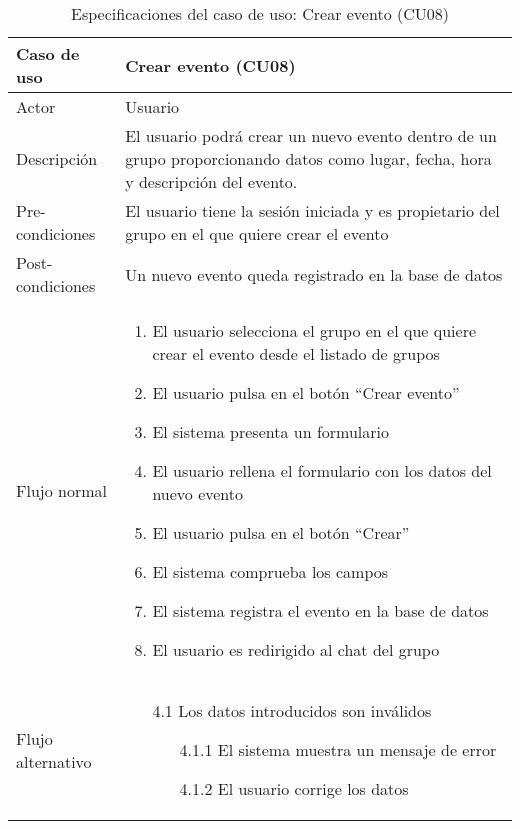 \begin{table}[h]
    \centering
    \begin{tabular}{|m{3cm}|m{11cm}|}
        \hline
        \rowcolor{blue!20} Caso de uso & Crear evento (CU08) \\
        \hline
        Actor & Usuario \\
        \hline
        \rowcolor{blue!20} Descripción & El usuario podrá crear un nuevo evento dentro de un grupo proporcionando datos como lugar, fecha, hora y descripción del evento. \\
        \hline
        Pre-condiciones & El usuario tiene la sesión iniciada y es propietario del grupo en el que quiere crear el evento \\
        \hline
        \rowcolor{blue!20} Post-condiciones & Un nuevo evento queda registrado en la base de datos \\
        \hline
        Flujo normal & 
            \begin{enumerate}[noitemsep]
            \item El usuario selecciona el grupo en el que quiere crear el evento desde el listado de grupos
            \item El usuario pulsa en el botón \enquote{Crear evento}
            \item El sistema presenta un formulario
            \item El usuario rellena el formulario con los datos del nuevo evento
            \item El usuario pulsa en el botón \enquote{Crear}
            \item El sistema comprueba los campos
            \item El sistema registra el evento en la base de datos
            \item El usuario es redirigido al chat del grupo
            \end{enumerate}
         \\
         \hline
        Flujo alternativo & 
        \begin{enumerate}[noitemsep]
            \item[4.1] Los datos introducidos son inválidos
            \begin{enumerate}[noitemsep]
                \item[4.1.1] El sistema muestra un mensaje de error
                \item[4.1.2] El usuario corrige los datos
            \end{enumerate}
        \end{enumerate} \\
        \hline
    \end{tabular}
    \caption{Especificaciones del caso de uso: Crear evento (CU08)}
\end{table}

